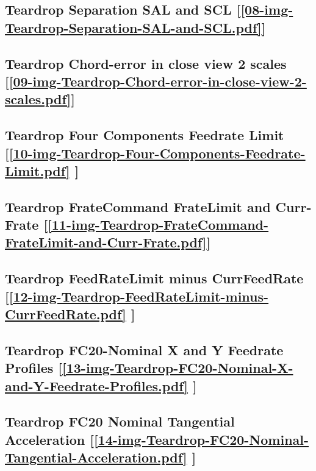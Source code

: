 \subsection       {Teardrop Separation SAL and SCL
	[\ref      {08-img-Teardrop-Separation-SAL-and-SCL.pdf}] }
\label{ssec-08-img-Teardrop-Separation-SAL-and-SCL.pdf}

\subsection       {Teardrop Chord-error in close view 2 scales
	[\ref      {09-img-Teardrop-Chord-error-in-close-view-2-scales.pdf}] }
\label{ssec-09-img-Teardrop-Chord-error-in-close-view-2-scales.pdf}

\subsection       {Teardrop Four Components Feedrate Limit
	[\ref      {10-img-Teardrop-Four-Components-Feedrate-Limit.pdf} ] }
\label{ssec-10-img-Teardrop-Four-Components-Feedrate-Limit.pdf}

\subsection    {Teardrop FrateCommand FrateLimit and Curr-Frate
	[\ref      {11-img-Teardrop-FrateCommand-FrateLimit-and-Curr-Frate.pdf}] }
\label{ssec-11-img-Teardrop-FrateCommand-FrateLimit-and-Curr-Frate.pdf}

\subsection     {Teardrop FeedRateLimit minus CurrFeedRate
	[\ref      {12-img-Teardrop-FeedRateLimit-minus-CurrFeedRate.pdf} ] }
\label{ssec-12-img-Teardrop-FeedRateLimit-minus-CurrFeedRate.pdf}

\subsection     {Teardrop FC20-Nominal X and Y Feedrate Profiles
	[\ref      {13-img-Teardrop-FC20-Nominal-X-and-Y-Feedrate-Profiles.pdf} ] }
\label{ssec-13-img-Teardrop-FC20-Nominal-X-and-Y-Feedrate-Profiles.pdf}

\subsection     {Teardrop FC20 Nominal Tangential Acceleration
	[\ref      {14-img-Teardrop-FC20-Nominal-Tangential-Acceleration.pdf} ] }
\label{ssec-14-img-Teardrop-FC20-Nominal-Tangential-Acceleration.pdf}


